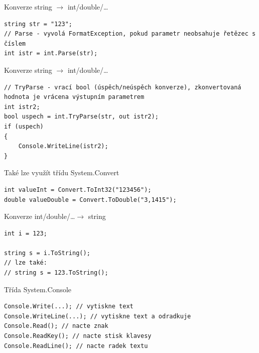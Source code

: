 \begin{frame}[fragile]
\vfill
\begin{exampleblock}{Konverze string $\rightarrow$ int/double/\ldots}
\begin{lstlisting}
string str = "123";
// Parse - vyvolá FormatException, pokud parametr neobsahuje řetězec s číslem
int istr = int.Parse(str);
\end{lstlisting}
\end{exampleblock}
\vfill
\begin{exampleblock}{Konverze string $\rightarrow$ int/double/\ldots}
\begin{lstlisting}
// TryParse - vrací bool (úspěch/neúspěch konverze), zkonvertovaná hodnota je vrácena výstupním parametrem
int istr2;
bool uspech = int.TryParse(str, out istr2);
if (uspech) 
{
    Console.WriteLine(istr2);
}
\end{lstlisting}
\end{exampleblock}
\vfill
\end{frame}


\begin{frame}[fragile]
\vfill
\begin{exampleblock}{Také lze využít třídu System.Convert}
\begin{lstlisting}
int valueInt = Convert.ToInt32("123456");
double valueDouble = Convert.ToDouble("3,1415");
\end{lstlisting}
\end{exampleblock}
\vfill
\begin{exampleblock}{Konverze int/double/\ldots $\rightarrow$ string}
\begin{lstlisting}
int i = 123;

string s = i.ToString();
// lze také:
// string s = 123.ToString();
\end{lstlisting}
\end{exampleblock}
\vfill
\end{frame}


\begin{frame}[fragile]
\begin{exampleblock}{Třída System.Console}
\begin{lstlisting}
Console.Write(...); // vytiskne text
Console.WriteLine(...); // vytiskne text a odradkuje
Console.Read(); // nacte znak
Console.ReadKey(); // nacte stisk klavesy
Console.ReadLine(); // nacte radek textu
\end{lstlisting}
\end{exampleblock}
\end{frame}
